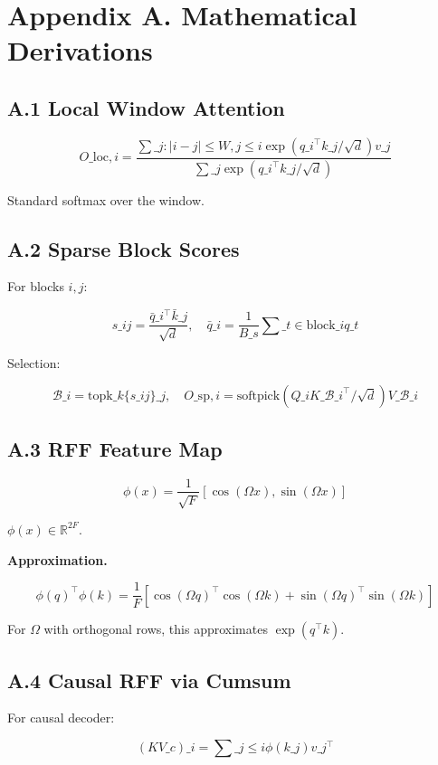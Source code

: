 
\section{Appendix A. Mathematical Derivations}

\subsection{A.1 Local Window Attention}

\[
O\_{\text{loc}, i} = \frac{\sum\_{j: |i - j| \leq W, j \leq i} \exp(q\_i^\top k\_j / \sqrt{d}) v\_j}{\sum\_{j} \exp(q\_i^\top k\_j / \sqrt{d})}
\tag{A.1}
\]

Standard softmax over the window.

\subsection{A.2 Sparse Block Scores}

For blocks $i, j$:

\[
s\_{ij} = \frac{\bar{q}\_i^\top \bar{k}\_j}{\sqrt{d}}, \quad
\bar{q}\_i = \frac{1}{B\_s} \sum\_{t \in \text{block}\_i} q\_t
\tag{A.2}
\]

Selection:

\[
\mathcal{B}\_i = \text{topk}\_{k}\{s\_{ij}\}\_j, \quad
O\_{\text{sp}, i} = \text{softpick}(Q\_i K\_{\mathcal{B}\_i}^\top / \sqrt{d}) V\_{\mathcal{B}\_i}
\tag{A.3}
\]

\subsection{A.3 RFF Feature Map}

\[
\phi(x) = \frac{1}{\sqrt{F}} [\cos(\Omega x), \sin(\Omega x)]
\tag{A.4}
\]

$\phi(x) \in \mathbb{R}^{2F}$.

\textbf{Approximation.}

\[
\phi(q)^\top \phi(k) = \frac{1}{F} [\cos(\Omega q)^\top \cos(\Omega k) + \sin(\Omega q)^\top \sin(\Omega k)]
\tag{A.5}
\]

For $\Omega$ with orthogonal rows, this approximates $\exp(q^\top k)$.

\subsection{A.4 Causal RFF via Cumsum}

For causal decoder:

\[
(KV\_c)\_i = \sum\_{j \leq i} \phi(k\_j) v\_j^\top
\tag{A.6}
\]

